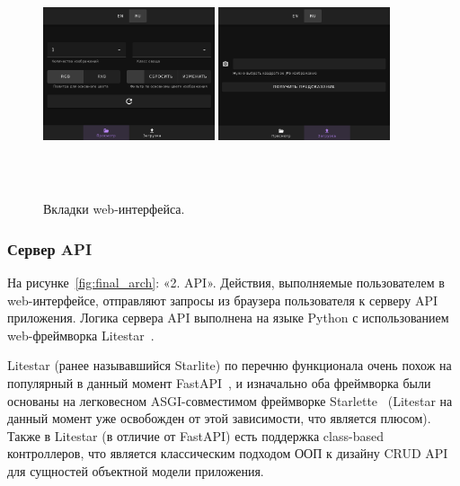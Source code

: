 \documentclass[a4paper,12pt]{extarticle}
\begin{document}
\begin{figure}[ht]
	\centering
	\includegraphics[width=0.45\textwidth,height=6.5cm]{tab_browse.png}
	\includegraphics[width=0.45\textwidth,height=6.5cm]{tab_upload.png}
	\caption{Вкладки web-интерфейса.}
	\label{fig:tabs}
\end{figure}

\subsubsection{Сервер API}

На рисунке~\ref{fig:final_arch}: «2. API». Действия, выполняемые пользователем в web-интерфейсе,
отправляют запросы из браузера пользователя к серверу API приложения. Логика сервера API выполнена
на языке Python с использованием web-фреймворка Litestar~\cite{litestar}.

Litestar (ранее называвшийся Starlite) по перечню функционала очень похож на популярный в данный
момент FastAPI~\cite{fastapi}, и изначально оба фреймворка были основаны на легковесном
ASGI-совместимом фреймворке Starlette~\cite{starlette} (Litestar на данный момент уже освобожден от
этой зависимости, что является плюсом). Также в Litestar (в отличие от FastAPI) есть поддержка
class-based контроллеров, что является классическим подходом ООП к дизайну CRUD API для сущностей
объектной модели приложения.
\end{document}
